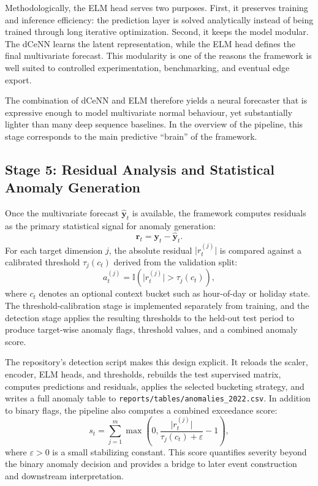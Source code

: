 Methodologically, the ELM head serves two purposes. First, it preserves training and inference efficiency: the prediction layer is solved analytically instead of being trained through long iterative optimization. Second, it keeps the model modular. The dCeNN learns the latent representation, while the ELM head defines the final multivariate forecast. This modularity is one of the reasons the framework is well suited to controlled experimentation, benchmarking, and eventual edge export.

The combination of dCeNN and ELM therefore yields a neural forecaster that is expressive enough to model multivariate normal behaviour, yet substantially lighter than many deep sequence baselines. In the overview of the pipeline, this stage corresponds to the main predictive ``brain'' of the framework.

\subsection{Stage 5: Residual Analysis and Statistical Anomaly Generation}

Once the multivariate forecast $\hat{\mathbf{y}}_t$ is available, the framework computes residuals as the primary statistical signal for anomaly generation:
\begin{equation}
	\mathbf{r}_t = \mathbf{y}_t - \hat{\mathbf{y}}_t.
	\label{eq:framework_residuals}
\end{equation}
For each target dimension $j$, the absolute residual $\lvert r_t^{(j)} \rvert$ is compared against a calibrated threshold $\tau_j(c_t)$ derived from the validation split:
\begin{equation}
	a_t^{(j)} = \mathbb{I}\!\left(\lvert r_t^{(j)} \rvert > \tau_j(c_t)\right),
	\label{eq:framework_flags}
\end{equation}
where $c_t$ denotes an optional context bucket such as hour-of-day or holiday state. The threshold-calibration stage is implemented separately from training, and the detection stage applies the resulting thresholds to the held-out test period to produce target-wise anomaly flags, threshold values, and a combined anomaly score.

The repository’s detection script makes this design explicit. It reloads the scaler, encoder, ELM heads, and thresholds, rebuilds the test supervised matrix, computes predictions and residuals, applies the selected bucketing strategy, and writes a full anomaly table to \texttt{reports/tables/anomalies\_2022.csv}. In addition to binary flags, the pipeline also computes a combined exceedance score:
\begin{equation}
	s_t = \sum_{j=1}^{m} \max\!\left(0,\frac{\lvert r_t^{(j)} \rvert}{\tau_j(c_t)+\varepsilon} - 1\right),
	\label{eq:framework_score}
\end{equation}
where $\varepsilon > 0$ is a small stabilizing constant. This score quantifies severity beyond the binary anomaly decision and provides a bridge to later event construction and downstream interpretation.

